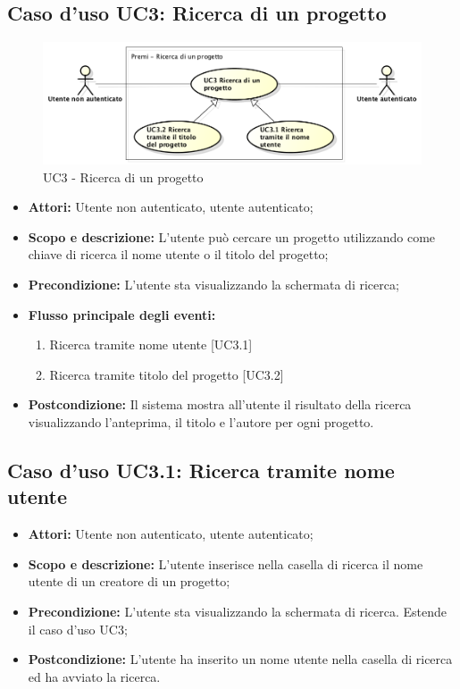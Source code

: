 \subsection{Caso d'uso UC3: Ricerca di un progetto}
\begin{figure}[h] 
	\centering 
	\includegraphics[scale=0.45] {img/UC3.png} 
	\caption{UC3 - Ricerca di un progetto} 
\end{figure}

\begin{itemize}
	\item \textbf{Attori:} Utente non autenticato, utente autenticato;
	\item \textbf{Scopo e descrizione:} L'utente può cercare un progetto utilizzando come chiave di ricerca il nome utente o il titolo del progetto;
	\item \textbf{Precondizione:} L'utente sta visualizzando la schermata di ricerca;
	\item \textbf{Flusso principale degli eventi:}
	\begin{enumerate}
		\item Ricerca tramite nome utente [UC3.1]
		\item Ricerca tramite titolo del progetto [UC3.2]
	\end{enumerate}
	\item \textbf{Postcondizione:} Il sistema mostra all'utente il risultato della ricerca visualizzando l'anteprima, il titolo e l'autore per ogni progetto.
\end{itemize}

\subsection{Caso d'uso UC3.1: Ricerca tramite nome utente}
\begin{itemize}
	\item \textbf{Attori:} Utente non autenticato, utente autenticato;
	\item \textbf{Scopo e descrizione:} L'utente inserisce nella casella di ricerca il nome utente di un creatore di un progetto;
	\item \textbf{Precondizione:} L'utente sta visualizzando la schermata di ricerca. Estende il caso d'uso UC3;
	\item \textbf{Postcondizione:} L'utente ha inserito un nome utente nella casella di ricerca ed ha avviato la ricerca.
\end{itemize}

